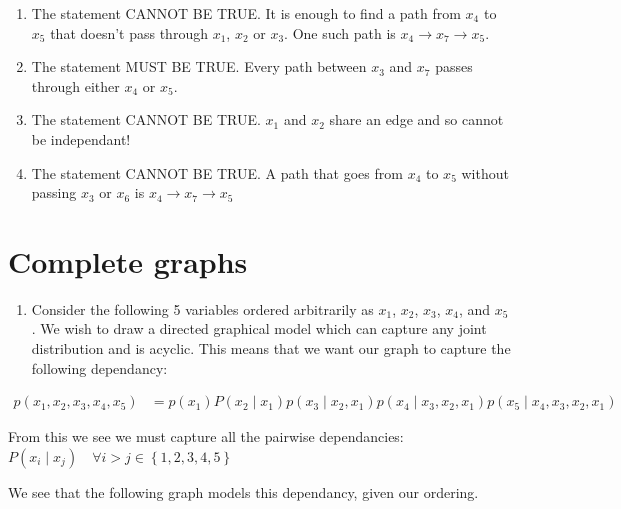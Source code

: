 \documentclass[]{article}
\providecommand{\tightlist}{%
  \setlength{\itemsep}{0pt}\setlength{\parskip}{0pt}}
\begin{document}
\begin{enumerate}
\def\labelenumi{\arabic{enumi}.}
\item
  The statement CANNOT BE TRUE. It is enough to find a path from \(x_4\)
  to \(x_5\) that doesn't pass through \(x_1\), \(x_2\) or \(x_3\). One
  such path is \(x_4 \rightarrow x_7 \rightarrow x_5\).
\item
  The statement MUST BE TRUE. Every path between \(x_3\) and \(x_7\)
  passes through either \(x_4\) or \(x_5\).
\item
  The statement CANNOT BE TRUE. \(x_1\) and \(x_2\) share an edge and so
  cannot be independant!
\item
  The statement CANNOT BE TRUE. A path that goes from \(x_4\) to \(x_5\)
  without passing \(x_3\) or \(x_6\) is
  \(x_4 \rightarrow x_7 \rightarrow x_5\)
\end{enumerate}

\newpage

\section{Complete graphs}\label{complete-graphs}

\begin{enumerate}
\def\labelenumi{\arabic{enumi}.}
\tightlist
\item
  Consider the following 5 variables ordered arbitrarily as \(x_1\),
  \(x_2\), \(x_3\), \(x_4\), and \(x_5\). We wish to draw a directed
  graphical model which can capture any joint distribution and is
  acyclic. This means that we want our graph to capture the following
  dependancy:
\end{enumerate}

\begin{align*}
p(x_1, x_2, x_3, x_4, x_5) &= p(x_1)P(x_2 \mid x_1)p(x_3 \mid x_2, x_1)p(x_4 \mid x_3, x_2, x_1)p(x_5 \mid x_4, x_3, x_2, x_1) 
\end{align*}

From this we see we must capture all the pairwise dependancies:
\(P(x_i \mid x_j) \quad \forall i > j \in \left\{ {1, 2, 3, 4, 5}\right\}\)

We see that the following graph models this dependancy, given our
ordering.
\end{document}

